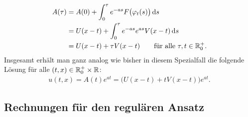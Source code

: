 \begin{align}
A(\tau) &= A(0) +\int_0^\tau e^{-a s} F\bigl( \varphi_t(s) \bigr) \,\mathrm d s\\
&= U(x-t) +\int_0^\tau e^{-a s} e^{as} V(x - t) \,\mathrm d s\\
&= U(x-t) + \tau V(x-t) \qquad \text{für alle $\tau, t \in \mathbb R^+_0.$}
\end{align}
Insgesamt erhält man ganz analog wie bisher in diesem Spezialfall die folgende Lösung für alle $(t,x) \in \mathbb R^+_0 \times \mathbb R$:
\begin{align}
u(t,x)= A(t) e^{a t} = \bigl( U(x-t) + t V(x-t) \bigr) e^{a t}.
\end{align}

\subsection{Rechnungen für den regulären Ansatz}
\label{appendix:regulaer:rechnungen}
